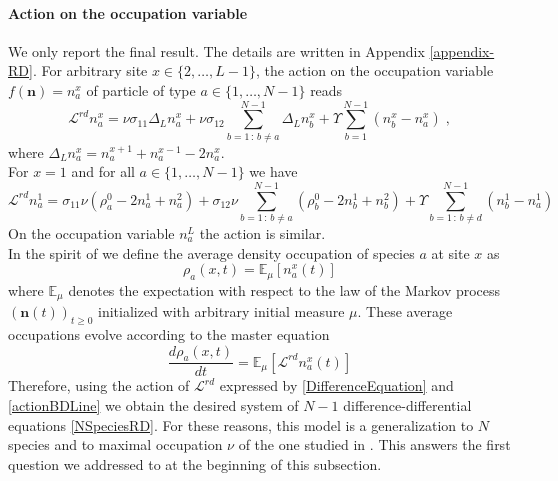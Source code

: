 \documentclass[10pt]{article}
\numberwithin{equation}{section}
\numberwithin{equation}{subsection}
\newcommand{\co}{\;,}
\begin{document}
\paragraph{Action on the occupation variable}
We only report the final result. The details are written in Appendix \ref{appendix-RD}. For arbitrary site $x\in \{2,\ldots,L-1\}$, the action on the occupation variable $f(\bm{n})=n_{a}^{x}$ of particle of type $a\in \{1,\ldots,N-1\}$ reads
\begin{equation}\label{DifferenceEquation}
	\mathcal{L}^{rd}n_{a}^{x}=\nu\sigma_{11}\Delta_{L}n_{a}^{x}+\nu\sigma_{12}\sum_{b=1\,:\,b\neq a}^{N-1}\Delta_{L}n_{b}^{x}+\Upsilon\sum_{b=1}^{N-1}(n_{b}^{x}-n_{a}^{x})\co
\end{equation}
where $\Delta_{L}n_{a}^{x}= n_{a}^{x+1}+n_{a}^{x-1}-2n_{a}^{x}$. \\For $x=1$ and for all $a\in \{1,\ldots,N-1\}$ we have 
\begin{equation}\label{actionBDLine}
	\mathcal{L}^{rd}n_{a}^{1}=\sigma_{11}\nu \left(\rho_{a}^{0}-2n_{a}^{1}+n_{a}^{2}\right)+\sigma_{12}\nu\sum_{b=1\,:\,b\neq a}^{N-1}\left(\rho_{b}^{0}-2n_{b}^{1}+n_{b}^{2}\right)+\Upsilon\sum_{b=1\,:\,b\neq d}^{N-1}\left(n_{b}^{1}-n_{a}^{1}\right)
\end{equation}
On the occupation variable $n_{a}^{L}$ the action is similar. \\ In the spirit of \cite{casini2022uphill} we define the average density occupation of species $a$ at site $x$ as
\begin{equation}
	\rho_{a}(x,t)=\mathbb{E}_{\mu}\left[n_{a}^{x}(t)\right]
\end{equation}
where $\mathbb{E}_{\mu}$ denotes the expectation with respect to the law of the Markov process $(\bm{n}(t))_{t\geq 0}$ initialized with arbitrary initial measure $\mu$. These average occupations evolve according to the master equation
\begin{equation}
	\frac{d \rho_{a}(x,t)}{dt}=\mathbb{E}_{\mu}\left[\mathcal{L}^{rd}n_{a}^{x}(t)\right]
\end{equation} 
Therefore, using the action of $\mathcal{L}^{rd}$ expressed by \eqref{DifferenceEquation} and \eqref{actionBDLine} we obtain the desired system of $N-1$ difference-differential equations \eqref{NSpeciesRD}. For these reasons, this model is a generalization to $N$ species and to maximal occupation $\nu$ of the one studied in \cite{casini2022uphill}. This answers the first question we addressed to at the beginning of this subsection. 
\end{document}
